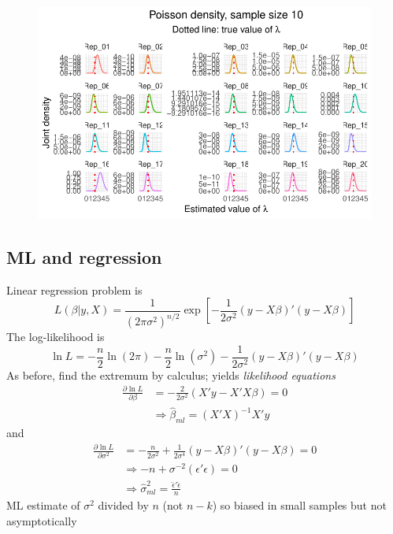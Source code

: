\documentclass[
  letterpaper,
]{book}
\begin{document}
\begin{figure}[H]

{\centering \includegraphics{CK_files/figure-pdf/unnamed-chunk-3-1.pdf}

}

\end{figure}

\hypertarget{ml-and-regression}{%
\subsection{ML and regression}\label{ml-and-regression}}

Linear regression problem is \begin{equation}
L(\beta|y,X) = \frac{1}{(2\pi \sigma^2)^{n/2}}\exp \left[ - \frac{1}{2\sigma^2} (y-X\beta)'(y-X\beta) \right]
\end{equation} The log-likelihood is \begin{equation}
   \ln L = -\frac{n}{2}\ln (2\pi)-\frac{n}{2}\ln (\sigma^2) - \frac{1}{2\sigma^2}(y-X\beta)'(y-X\beta)
\end{equation} As before, find the extremum by calculus; yields
\emph{likelihood equations} \begin{align}
\frac{\partial \ln L}{\partial \beta} & = - \frac{2}{2\sigma^2} (X'y-X'X\beta) = 0 \\
& \Rightarrow \hat{\beta}_{ml} = (X'X)^{-1}X'y
\end{align} and \begin{align}
\frac{\partial \ln L}{\partial \sigma^2} &=
   - \frac{n}{2\sigma^2} + \frac{1}{2\sigma^4}   
     (y - X\beta)'(y - X\beta) = 0 \\
& \Rightarrow -n + \sigma^{-2} (\epsilon'\epsilon) = 0 \\
& \Rightarrow \hat{\sigma}_{ml}^2 = \frac{\hat{\epsilon}'\hat{\epsilon}}{n}
\end{align} ML estimate of \(\sigma^2\) divided by \(n\) (not \(n-k\))
so biased in small samples but not asymptotically
\end{document}
